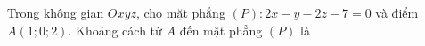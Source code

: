 \begin{ex}
Trong không gian $Oxyz$, cho mặt phẳng $(P)\colon 2x-y-2z-7=0$ và điểm $A(1;0;2)$. Khoảng cách từ $A$ đến mặt phẳng $(P)$ là
\end{ex}
